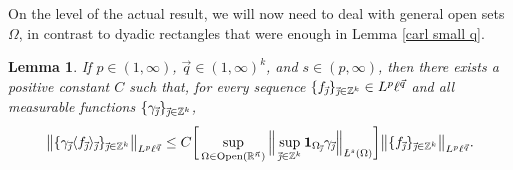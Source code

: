 \documentclass[11pt, reqno]{amsart}
\newtheorem{lemma}[theorem]{Lemma}
\theoremstyle{definition}
\theoremstyle{remark}
\numberwithin{equation}{section}
\newcommand{\R}{\mathbb R}
\newcommand{\vj}{\vec{\textit{\j}}}
\newcommand{\vn}{\vec n}
\newcommand{\vq}{\vec q}
\newcommand{\one}{\mathbf{1}}
\newcommand{\aveL}{\textit{\L}}
\newcommand{\Avee}[2]{\langle#1\rangle_{#2}}
\newcommand{\bNorm}[2]{\big\|#1\big\|_{#2}}
\newcommand{\Open}{\mathrm{Open}}
\begin{document}
On the level of the actual result, we will now need to deal with general open sets $\Omega$, in contrast to dyadic rectangles that were enough in Lemma \ref{carl small q}.

\begin{lemma}\label{carl >1}
If $p\in(1,\infty)$, $\vq\in(1,\infty)^k$, and $s\in(p,\infty)$,
then there exists a positive constant $C$ such that,
for every sequence $\{f_{\vj}\}_{\vj\in\mathbb Z^k}\in L^p\ell^{\vq}$ and
all measurable functions $\{\gamma_{\vj}\}_{\vj\in\mathbb Z^k}$,
\begin{equation}\label{carl >1eq}
\bNorm{\{\gamma_{\vj}\Avee{f_{\vj}}{\vj}\}_{\vj\in\mathbb Z^k}}{L^p\ell^{\vq}}
\leq C
\bigg[\sup_{\Omega\in\Open(\R^{\vn})}\Big\|\sup_{\vj\in\mathbb Z^k}\one_{\Omega_{\vj}}\gamma_{\vj}\Big\|_{\aveL^s(\Omega)}\bigg]
\bNorm{\{ f_{\vj}\}_{\vj\in\mathbb Z^k}}{L^p\ell^{\vq}}.
\end{equation}
\end{lemma}
\end{document}
